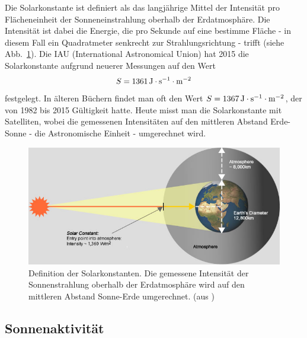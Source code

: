 Die Solarkonstante ist definiert als das langj\"ahrige Mittel der Intensit\"at pro Fl\"acheneinheit der 
Sonneneinstrahlung oberhalb der Erdatmosph\"are. 
Die Intensit\"at ist dabei die Energie, die pro Sekunde 
auf eine bestimme Fl\"ache - in diesem Fall ein Quadratmeter senkrecht zur Strahlungsrichtung - trifft
(siehe Abb.\ \ref{fig_solar_constant}). 
Die IAU (International Astronomical Union) hat 2015 die Solarkonstante aufgrund neuerer
Messungen auf den Wert
\begin{equation}
               S = 1361\,{\rm J \cdot s^{-1} \cdot m^{-2}}
\end{equation}
festgelegt. In \"alteren B\"uchern findet man oft den Wert $S= 1367\,{\rm J \cdot s^{-1} \cdot m^{-2}}$, der
von 1982 bis 2015 G\"ultigkeit hatte. Heute misst man die Solarkonstante mit Satelliten, wobei die
gemessenen Intensit\"aten auf den mittleren Abstand Erde-Sonne - die Astronomische Einheit - 
umgerechnet wird.

\begin{figure}
\includegraphics[scale=0.4]{./Bilder_Klima/solar-constant.jpg}
\caption{\label{fig_solar_constant}%
Definition der Solarkonstanten. Die gemessene Intensit\"at der Sonnenstrahlung
oberhalb der Erdatmosph\"are wird auf den mittleren Abstand Sonne-Erde umgerechnet.
(aus \cite{Solar})}
\end{figure}


\subsection{Sonnenaktivit\"at}

